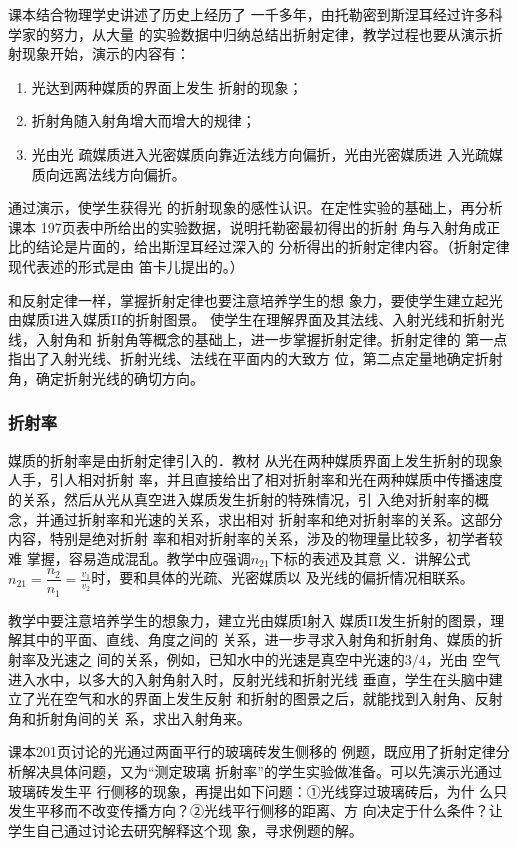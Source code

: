 课本结合物理学史讲述了历史上经历了
一千多年，由托勒密到斯涅耳经过许多科学家的努力，从大量
的实验数据中归纳总结出折射定律，教学过程也要从演示折
射现象开始，演示的内容有：
\begin{enumerate}
\item 光达到两种媒质的界面上发生
折射的现象；
\item 折射角随入射角增大而增大的规律；
\item 光由光
疏媒质进入光密媒质向靠近法线方向偏折，光由光密媒质进
入光疏媒质向远离法线方向偏折。
\end{enumerate}
通过演示，使学生获得光
的折射现象的感性认识。在定性实验的基础上，再分析课本
197页表中所给出的实验数据，说明托勒密最初得出的折射
角与入射角成正比的结论是片面的，给出斯涅耳经过深入的
分析得出的折射定律内容。（折射定律现代表述的形式是由
笛卡儿提出的。）

和反射定律一样，掌握折射定律也要注意培养学生的想
象力，要使学生建立起光由媒质I进入媒质II的折射图景。
使学生在理解界面及其法线、入射光线和折射光线，入射角和
折射角等概念的基础上，进一步掌握折射定律。折射定律的
第一点指出了入射光线、折射光线、法线在平面内的大致方
位，第二点定量地确定折射角，确定折射光线的确切方向。

\subsubsection{折射率}

媒质的折射率是由折射定律引入的．教材
从光在两种媒质界面上发生折射的现象人手，引人相对折射
率，并且直接给出了相对折射率和光在两种媒质中传播速度
的关系，然后从光从真空进入媒质发生折射的特殊情况，引
入绝对折射率的概念，并通过折射率和光速的关系，求出相对
折射率和绝对折射率的关系。这部分内容，特别是绝对折射
率和相对折射率的关系，涉及的物理量比较多，初学者较难
掌握，容易造成混乱。教学中应强调$n_{21}$下标的表述及其意
义．讲解公式$n_{21}=\dfrac{n_2}{n_1}=\frac{v_1}{v_2}$时，要和具体的光疏、光密媒质以
及光线的偏折情况相联系。

教学中要注意培养学生的想象力，建立光由媒质I射入
媒质II发生折射的图景，理解其中的平面、直线、角度之间的
关系，进一步寻求入射角和折射角、媒质的折射率及光速之
间的关系，例如，已知水中的光速是真空中光速的$3/4$，光由
空气进入水中，以多大的入射角射入时，反射光线和折射光线
垂直，学生在头脑中建立了光在空气和水的界面上发生反射
和折射的图景之后，就能找到入射角、反射角和折射角间的关
系，求出入射角来。

课本201页讨论的光通过两面平行的玻璃砖发生侧移的
例题，既应用了折射定律分析解决具体问题，又为“测定玻璃
折射率”的学生实验做准备。可以先演示光通过玻璃砖发生平
行侧移的现象，再提出如下问题：①光线穿过玻璃砖后，为什
么只发生平移而不改变传播方向？②光线平行侧移的距离、方
向决定于什么条件？让学生自己通过讨论去研究解释这个现
象，寻求例题的解。

